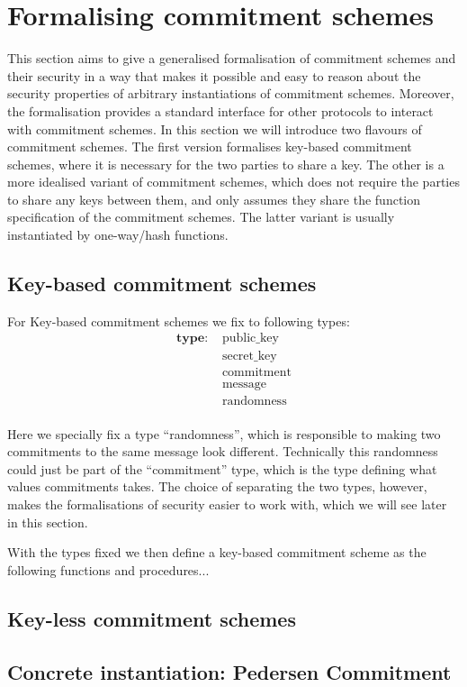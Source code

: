 \chapter{Formalising commitment schemes}
\label{ch:formal_commitment}
This section aims to give a generalised formalisation of commitment schemes and
their security in a way that makes it possible and easy to reason about the
security properties of arbitrary instantiations of commitment schemes. Moreover,
the formalisation provides a standard interface for other protocols to interact
with commitment schemes.
In this section we will introduce two flavours of commitment schemes. The first
version formalises key-based commitment schemes, where it is necessary for the
two parties to share a key. The other is a more idealised variant of commitment
schemes, which does not require the parties to share any keys between them, and
only assumes they share the function specification of the commitment schemes.
The latter variant is usually instantiated by one-way/hash functions.

\section{Key-based commitment schemes}
\label{sec:commitment:key-based}
For Key-based commitment schemes we fix to following types:
\begin{align*}
  \textbf{type: } &\text{public\_key} \\
  &\text{secret\_key} \\
  &\text{commitment} \\
  &\text{message} \\
  &\text{randomness} \\
\end{align*}

Here we specially fix a type ``randomness'', which is responsible to making two
commitments to the same message look different. Technically this randomness
could just be part of the ``commitment'' type, which is the type defining what
values commitments takes. The choice of separating the two types, however, makes
the formalisations of security easier to work with, which we will see later in
this section.

With the types fixed we then define a key-based commitment scheme as the
following functions and procedures...


\section{Key-less commitment schemes}
\label{sec:commitment:key-less}


\section{Concrete instantiation: Pedersen Commitment}
\label{sec:label}



